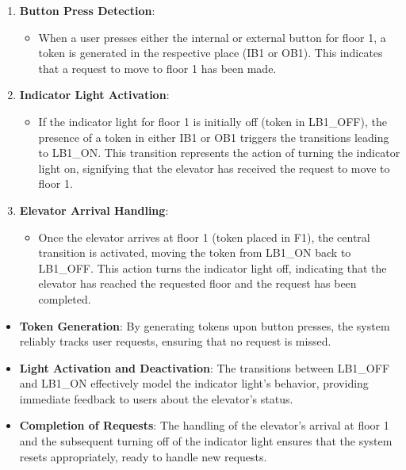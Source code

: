 \documentclass[12pt	]{article}
\begin{document}
\begin{enumerate}
	\item \textbf{Button Press Detection}:
	\begin{itemize}
		\item When a user presses either the internal or external button for floor 1, a token is generated in the respective place (IB1 or OB1). This indicates that a request to move to floor 1 has been made.
	\end{itemize}
	\item \textbf{Indicator Light Activation}:
	\begin{itemize}
		\item If the indicator light for floor 1 is initially off (token in LB1\_OFF), the presence of a token in either IB1 or OB1 triggers the transitions leading to LB1\_ON. This transition represents the action of turning the indicator light on, signifying that the elevator has received the request to move to floor 1.
	\end{itemize}
	\item \textbf{Elevator Arrival Handling}:
	\begin{itemize}
		\item Once the elevator arrives at floor 1 (token placed in F1), the central transition is activated, moving the token from LB1\_ON back to LB1\_OFF. This action turns the indicator light off, indicating that the elevator has reached the requested floor and the request has been completed.
	\end{itemize}
\end{enumerate}


\begin{itemize}
	\item \textbf{Token Generation}: By generating tokens upon button presses, the system reliably tracks user requests, ensuring that no request is missed.
	\item \textbf{Light Activation and Deactivation}: The transitions between LB1\_OFF and LB1\_ON effectively model the indicator light's behavior, providing immediate feedback to users about the elevator's status.
	\item \textbf{Completion of Requests}: The handling of the elevator's arrival at floor 1 and the subsequent turning off of the indicator light ensures that the system resets appropriately, ready to handle new requests.
\end{itemize}
\end{document}
